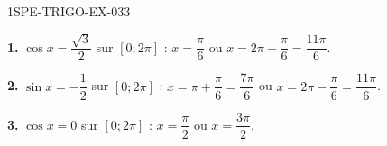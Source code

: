 \begin{corrige}{1SPE-TRIGO-EX-033}

\textbf{1.} $\cos x = \dfrac{\sqrt{3}}{2}$ sur $[0;2\pi]$ : $x = \dfrac{\pi}{6}$ ou $x = 2\pi - \dfrac{\pi}{6} = \dfrac{11\pi}{6}$.

\textbf{2.} $\sin x = -\dfrac{1}{2}$ sur $[0;2\pi]$ : $x = \pi + \dfrac{\pi}{6} = \dfrac{7\pi}{6}$ ou $x = 2\pi - \dfrac{\pi}{6} = \dfrac{11\pi}{6}$.

\textbf{3.} $\cos x = 0$ sur $[0;2\pi]$ : $x = \dfrac{\pi}{2}$ ou $x = \dfrac{3\pi}{2}$.

\end{corrige}
